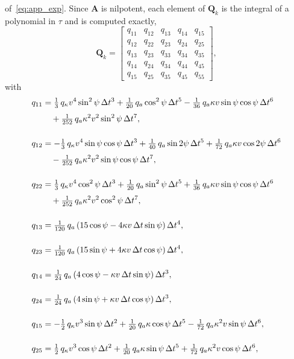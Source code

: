 of~\eqref{eq:app_exp}. Since $\mathbf{A}$ is nilpotent, each element of $\mathbf{Q}_k$ is the
integral of a polynomial in $\tau$ and is computed exactly,
\begin{equation}
    \renewcommand{\arraystretch}{1.3}
    \mathbf{Q}_k =
    \begin{bmatrix}
        q_{11} & q_{12} & q_{13} & q_{14} & q_{15} \\
        q_{12} & q_{22} & q_{23} & q_{24} & q_{25} \\
        q_{13} & q_{23} & q_{33} & q_{34} & q_{35} \\
        q_{14} & q_{24} & q_{34} & q_{44} & q_{45} \\
        q_{15} & q_{25} & q_{35} & q_{45} & q_{55}
    \end{bmatrix},
    \label{eq:app_Q}
\end{equation}
with
\begin{equation}
    \setlength{\jot}{6pt}
    \begin{aligned}
        q_{11} &= \tfrac{1}{3}\,q_\kappa v^4 \sin^2\psi\,\Delta t^3
                + \tfrac{1}{20}\,q_a \cos^2\psi\,\Delta t^5
                - \tfrac{1}{36}\,q_a \kappa v \sin\psi\cos\psi\,\Delta t^6 \\
               &\quad + \tfrac{1}{252}\,q_a \kappa^2 v^2 \sin^2\psi\,\Delta t^7, \\[10pt]
        q_{12} &= -\tfrac{1}{3}\,q_\kappa v^4 \sin\psi\cos\psi\,\Delta t^3
                + \tfrac{1}{40}\,q_a \sin 2\psi\,\Delta t^5
                + \tfrac{1}{72}\,q_a \kappa v \cos 2\psi\,\Delta t^6 \\
               &\quad - \tfrac{1}{252}\,q_a \kappa^2 v^2 \sin\psi\cos\psi\,\Delta t^7, \\[10pt]
        q_{22} &= \tfrac{1}{3}\,q_\kappa v^4 \cos^2\psi\,\Delta t^3
                + \tfrac{1}{20}\,q_a \sin^2\psi\,\Delta t^5
                + \tfrac{1}{36}\,q_a \kappa v \sin\psi\cos\psi\,\Delta t^6 \\
               &\quad + \tfrac{1}{252}\,q_a \kappa^2 v^2 \cos^2\psi\,\Delta t^7, \\[10pt]
        q_{13} &= \tfrac{1}{120}\,q_a \left(15\cos\psi - 4\kappa v\,\Delta t\sin\psi\right)\Delta t^4, \\[10pt]
        q_{23} &= \tfrac{1}{120}\,q_a \left(15\sin\psi + 4\kappa v\,\Delta t\cos\psi\right)\Delta t^4, \\[10pt]
        q_{14} &= \tfrac{1}{24}\,q_a \left(4\cos\psi - \kappa v\,\Delta t\sin\psi\right)\Delta t^3, \\[10pt]
        q_{24} &= \tfrac{1}{24}\,q_a \left(4\sin\psi + \kappa v\,\Delta t\cos\psi\right)\Delta t^3, \\[10pt]
        q_{15} &= -\tfrac{1}{2}\,q_\kappa v^3 \sin\psi\,\Delta t^2
                + \tfrac{1}{20}\,q_a \kappa \cos\psi\,\Delta t^5
                - \tfrac{1}{72}\,q_a \kappa^2 v \sin\psi\,\Delta t^6, \\[10pt]
        q_{25} &= \tfrac{1}{2}\,q_\kappa v^3 \cos\psi\,\Delta t^2
                + \tfrac{1}{20}\,q_a \kappa \sin\psi\,\Delta t^5
                + \tfrac{1}{72}\,q_a \kappa^2 v \cos\psi\,\Delta t^6,
    \end{aligned}
    \label{eq:app_Q_elements}
\end{equation}
